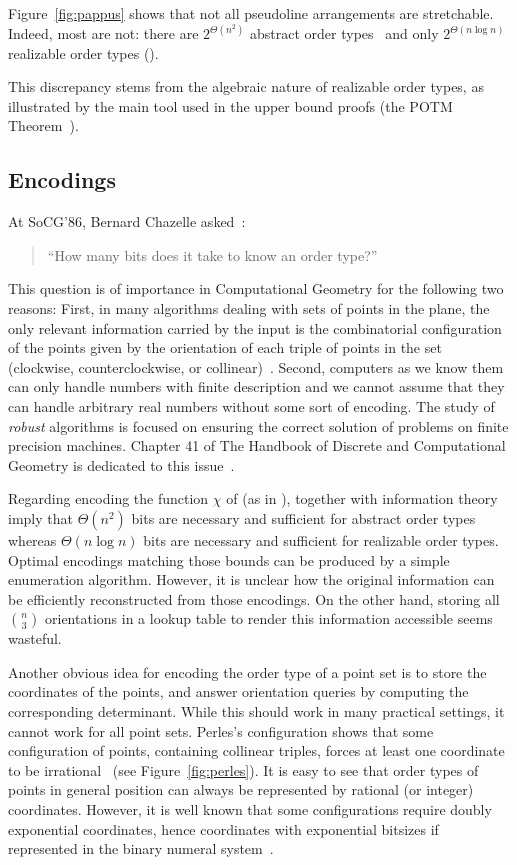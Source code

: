 Figure~\ref{fig:pappus} shows that not all pseudoline arrangements are
stretchable. Indeed, most are not: there are \(2^{\Theta(n^2)}\)
abstract order types~\cite{Fe96} and only \(2^{\Theta(n \log n)}\) realizable
order types ().
%

%
This discrepancy stems from the algebraic nature of realizable order types, as
illustrated by the main tool used in the upper bound proofs (the
POTM Theorem~\cite{Mi64,Th65,BPR06}).

\subsection{Encodings}%
\label{sec:history:pol:encodings}

At SoCG'86, Bernard Chazelle asked~\cite{GP93}:
\begin{quotation}
``How many bits does it take to know an order type?''
\end{quotation}

This question is of importance in Computational Geometry for the following two
reasons:
%
First, in many algorithms dealing with sets of points in the plane,
the only relevant information carried by the input is the combinatorial
configuration of the points given by the orientation of each triple of points in the
set (clockwise, counterclockwise, or collinear)~\cite{Knu92,Ed12,Epp18}.
%
Second, computers as we know them can only handle numbers with
finite description and we cannot assume that they can handle arbitrary
real numbers without some sort of encoding. The study of \emph{robust}
algorithms is focused on ensuring the correct solution of problems on finite
precision machines. Chapter 41 of The Handbook of Discrete and Computational
Geometry is dedicated to this issue~\cite{Ya04}.


Regarding encoding the function \(\chi\) of 
(as in ),
 together with information theory
imply that \(\Theta(n^2)\) bits are necessary
and sufficient for abstract order types whereas \(\Theta(n \log n)\) bits are
necessary and sufficient for realizable order types.
Optimal encodings matching those bounds can be produced
by a simple enumeration algorithm.
%
However, it is unclear how the original information can be
efficiently reconstructed from those encodings.
%
On the other hand, storing all \( \binom{n}{3} \) orientations in a lookup
table to render this information accessible seems wasteful.

Another obvious idea for encoding the order type of a point set is to store
the coordinates of the points, and answer orientation queries
by computing the corresponding determinant. While this should work in many practical
settings, it cannot work for all point sets. Perles's configuration shows that
some configuration of points, containing collinear triples, forces at least one
coordinate to be irrational~\cite{Gr05} (see Figure~\ref{fig:perles}).
%
It is easy to see that
order types of points in general position can always be represented by rational
(or integer) coordinates.
%
However, it is well known that some configurations require doubly
exponential coordinates, hence coordinates with exponential bitsizes if
represented in the binary numeral system~\cite{GPS89}.

